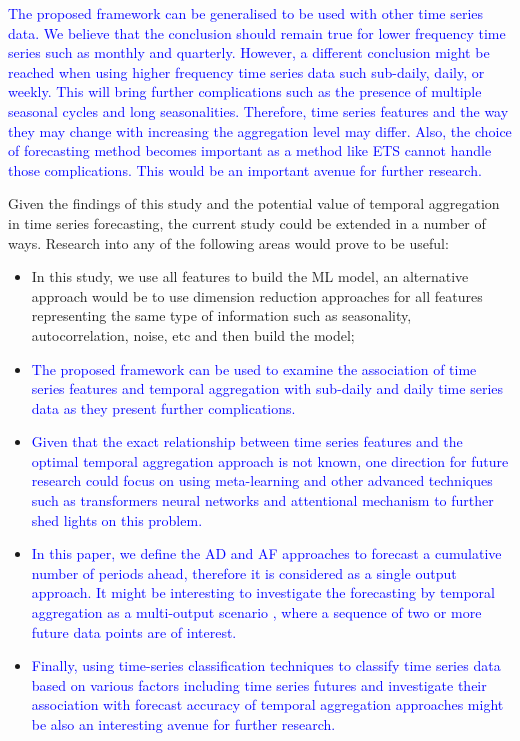 \documentclass[preprint, 3p,
authoryear]{elsarticle} %
\begin{document}
\textcolor{blue}{The proposed framework can be generalised to be used with other time series data. We believe that the conclusion should remain true for lower frequency time series such as monthly and quarterly. However, a different conclusion might be reached when using higher frequency time series data such sub-daily, daily, or weekly. This will bring further complications such as the presence of multiple seasonal cycles and long seasonalities. Therefore, time series features and the way they may change with increasing the aggregation level may differ. Also, the choice of forecasting method becomes important as a method like ETS cannot handle those complications. This would be an important avenue for further research.}

Given the findings of this study and the potential value of temporal
aggregation in time series forecasting, the current study could be
extended in a number of ways. Research into any of the following areas
would prove to be useful:

\begin{itemize}
\item
  In this study, we use all features to build the ML model, an
  alternative approach would be to use dimension reduction approaches
  for all features representing the same type of information such as
  seasonality, autocorrelation, noise, etc and then build the model;
\item
  \textcolor{blue}{The proposed framework can be used to examine the association of time series features and temporal aggregation with sub-daily and daily time series data as they present further complications.}
\item
  \textcolor{blue}{Given that the exact relationship between time series features and the optimal temporal aggregation approach is not known, one direction for future research could focus on using meta-learning and other advanced techniques such as transformers neural networks and attentional mechanism to further shed lights on this problem.}
\item
  \textcolor{blue}{In this paper, we define the AD and AF approaches to forecast a cumulative number of periods ahead, therefore it is considered as a single output approach. It might be interesting to investigate the forecasting by temporal aggregation as a multi-output scenario}
  \citep{de2022data}\textcolor{blue}{, where a sequence of two or more future data points are of interest.}
\item
  \textcolor{blue}{Finally, using time-series classification techniques}
  \citep{buza2018time}
  \textcolor{blue}{to classify time series data based on various factors including time series futures and investigate their association with forecast accuracy of temporal aggregation approaches might be also an interesting avenue for further research.}
\end{itemize}
\end{document}
